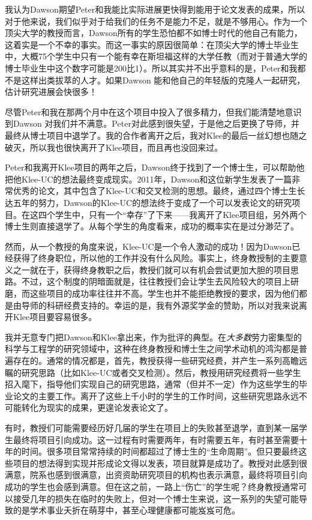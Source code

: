 \documentclass[12pt,UTF8,nofonts]{book}
\begin{document}
我认为Dawson期望Peter和我能比实际进展更快得到能用于论文发表的成果，所以对于他来说，我们似乎对于给我们的任务不是能力不足，就是不够用心。作为一个顶尖大学的教授而言，Dawson所有的学生恐怕都不如博士时代的他自己有能力，这着实是一个不幸的事实。而这一事实的原因很简单：在顶尖大学的博士毕业生中，大概75个学生中只有一个能有幸在斯坦福这样的大学任教（而对于普通大学的博士毕业生中这个数字可能是200比1）。所以其实并不出乎意料的是，Peter和我都不是这样出类拔萃的人才。如果Dawson 能和他自己的年轻版的克隆人一起研究，估计研究进展会快很多！

尽管Peter和我在那两个月中在这个项目中投入了很多精力，但我们能清楚地意识到Dawson 对我们并不满意。Peter对此感到很失望，于是他之后更换了导师，并最终从博士项目中退学了。我的合作者离开之后，我对Klee的最后一丝幻想也随之破灭，所以我也很快离开了Klee项目，而且再也没回来过。

\breakline

Peter和我离开Klee项目的两年之后，Dawson终于找到了一个博士生，可以帮助他把他Klee-UC的想法最终变成现实。2011年，Dawson和这位新学生发表了一篇非常优秀的论文，其中包含了Klee-UC和交叉检测的思想。最终，通过四个博士生长达五年的努力，Dawson的Klee-UC的想法终于变成了一个可以发表论文的研究项目。在这四个学生中，只有一个“幸存”了下来——我离开了Klee项目组，另外两个博士生则直接退学了。从每个学生的角度看来，成功的概率实在是过分渺茫了。

然而，从一个教授的角度来说，Klee-UC是一个令人激动的成功！因为Dawson已经获得了终身职位，所以他的工作并没有什么风险。事实上，终身教授制的主要意义之一就在于，获得终身教职之后，教授们就可以有机会尝试更加大胆的项目思路。不过，这个制度的阴暗面就是，往往教授们会让学生去风险较大的项目上研磨，而这些项目的成功率往往并不高。学生也并不能拒绝教授的要求，因为他们都是由导师的科研经费支持的。幸运的是，我有外源奖学金的赞助，所以对我来说离开Klee项目要容易很多。

我并无意专门把Dawson和Klee拿出来，作为批评的典型。在\emph{大多数}劳力密集型的科学与工程学的研究领域中，这种在终身教授和博士生之间学术动机的鸿沟都是普遍存在的。通常的情况都是，首先，教授获得一些研究经费，并产生一系列高瞻远瞩的研究思路（比如Klee-UC或者交叉检测）。然后，教授用研究经费将一些学生招入麾下，指导他们实现自己的研究思路，通常（但并不一定）作为这些学生的毕业论文的主要工作。离开了这些上千小时的学生的工作时间，这些研究思路永远不可能转化为现实的成果，更遑论发表论文了。

有时，教授们可能需要经历好几届的学生在项目上的失败甚至退学，直到某一届学生最终将项目引向成功。这一过程有时需要两年，有时需要五年，有时甚至需要十年的时间。很多项目常常持续的时间都超过了博士生的“生命周期”。但只要最终这些项目的想法得到实现并形成论文得以发表，项目就算是成功了。教授对此感到很满意，院系也感到很满意，出资资助研究项目的机构也表示满意，最终将项目引向成功的学生也会感到满意。但在这之前，一路上“伤亡”的学生呢？终身教授通常可以接受几年的损失在临时的失败上，但对一个博士生来说，这一系列的失望可能导致的是学术事业夭折在萌芽中，甚至心理健康都可能岌岌可危。
\end{document}
